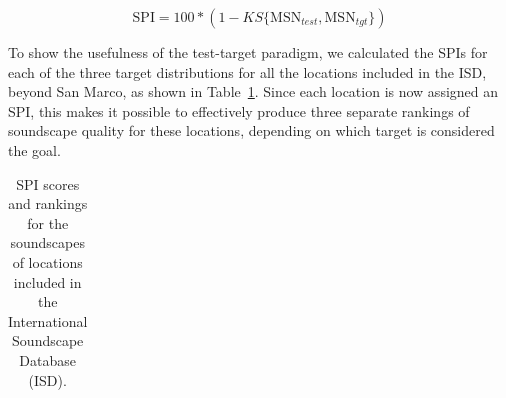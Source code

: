 \documentclass[
  authoryear,
  preprint,
  3p]{elsarticle}
\begin{document}
\[
\text{SPI} = 100 * (1 - KS\{\text{MSN}_{test}, \text{MSN}_{tgt}\})
\]

To show the usefulness of the test-target paradigm, we calculated the
SPIs for each of the three target distributions for all the locations
included in the ISD, beyond San Marco, as shown in
Table~\ref{tbl-ex-spis}. Since each location is now assigned an SPI,
this makes it possible to effectively produce three separate rankings of
soundscape quality for these locations, depending on which target is
considered the goal.

\begin{longtable}[]{@{}
  >{\raggedleft\arraybackslash}p{}
  >{\raggedright\arraybackslash}p{}
  >{\raggedright\arraybackslash}p{}
  >{\raggedright\arraybackslash}p{}@{}}

\caption{\label{tbl-ex-spis}SPI scores and rankings for the soundscapes
of locations included in the International Soundscape Database (ISD).}

\tabularnewline


\end{longtable}
\end{document}
